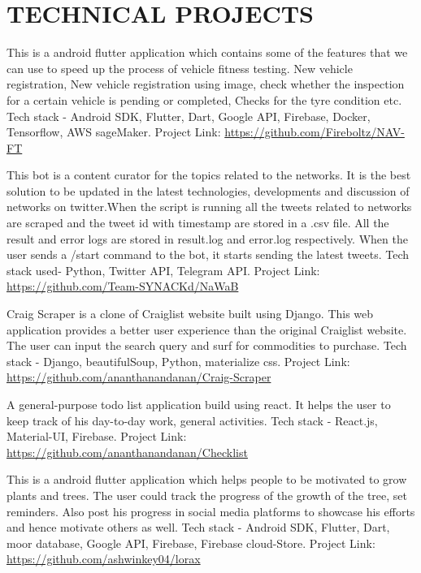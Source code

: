 \documentclass[11pt,a4paper,sans]{moderncv}        %
\begin{document}
\section{TECHNICAL PROJECTS}



{This is a android flutter application which contains some of the features that we can use to speed up the process of vehicle fitness testing. New vehicle registration, New vehicle registration using image, check whether the inspection for a certain vehicle is pending or completed, Checks for the tyre condition etc. Tech stack - Android SDK, Flutter, Dart, Google API, Firebase, Docker, Tensorflow, AWS sageMaker. Project Link: {\newline}
\url{https://github.com/Fireboltz/NAV-FT}}{}

{This bot is a content curator for the topics related to the networks. It is the best solution to be updated in the latest technologies, developments and discussion of networks on twitter.When the script is running all the tweets related to networks are scraped and the tweet id with timestamp are stored in a .csv file. All the result and error logs are stored in result.log and error.log respectively. When the user sends a /start command to the bot, it starts sending the latest tweets. Tech stack used- Python, Twitter API, Telegram API. Project Link: {\newline}
\url{https://github.com/Team-SYNACKd/NaWaB}}{}

{Craig Scraper is a clone of Craiglist website built using Django. This web application provides a better user experience than the original Craiglist website. The user can input the search query and surf for commodities to purchase.  Tech stack - Django, beautifulSoup, Python, materialize css. Project Link: {\newline}
\url{https://github.com/ananthanandanan/Craig-Scraper}}{}


{A general-purpose todo list application build using react. It helps the user to keep track of his day-to-day work, general activities. Tech stack - React.js, Material-UI, Firebase. Project Link: {\newline}
\url{https://github.com/ananthanandanan/Checklist}}{}


{This is a android flutter application which helps people to be motivated to grow plants and trees. The user could track the progress of the growth of the tree, set reminders. Also post his progress in social media platforms to showcase his efforts and hence motivate others as well. Tech stack - Android SDK, Flutter, Dart, moor database, Google API, Firebase, Firebase cloud-Store. Project Link: {\newline}
\url{https://github.com/ashwinkey04/lorax}}{}
\end{document}
